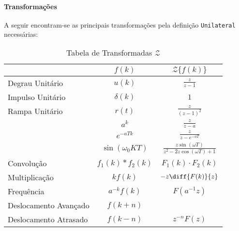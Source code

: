 \documentclass{article}
\begin{document}
    \paragraph{Transformações}A seguir encontram-se as principais transformações pela definição \texttt{Unilateral} necessárias:
    \begin{table}[H]
        \centering\begingroup
        \renewcommand{\arraystretch}{1.25}
        \begin{tabular}[]{lcc}
                                & $f(k)$      & $\mathcal{Z}\{ f(k) \}$\\\hline
            Degrau Unitário     & $u(k)$      & $\frac{z}{z-1}$\\
            Impulso Unitário    & $\delta(k)$ & $1$\\
            Rampa Unitário      & $r(t)$      & $\frac{z}{(z-1)^2}$\\
                                & $a^{k}$     & $\frac{z}{z-a}$\\
                                & $e^{-aTk}$  & $\frac{z}{z-e^{-aT}}$\\
                                & $\sin(\omega_0 KT)$ & $\frac{z\sin(\omega T)}{z^2 - 2z\cos(\omega T) + 1}$\\
            Convolução          & $f_1(k) * f_2(k)$ & $F_1(k)\cdot F_2(k)$\\
            Multiplicação         & $k f(k)$ & $-z \diff{F(k)}{z}$\\
            Frequência            & $a^{-k}f(k)$ & $F(a^{-1}z)$\\
            Deslocamento Avançado & $f(k+n)$ &\\
            Deslocamento Atrasado & $f(k-n)$ & $z^{-n}F(z)$\\\hline
        \end{tabular}
        \endgroup
        \caption{Tabela de Transformadas $\mathcal{Z}$}\label{table:Z}
    \end{table} \noindent
\end{document}
